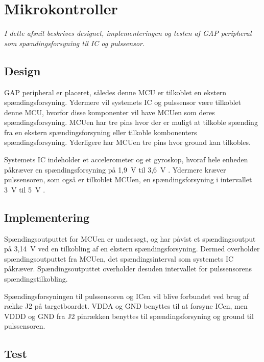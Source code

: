 \section{Mikrokontroller}
\textit{I dette afsnit beskrives designet, implementeringen og testen af GAP peripheral som spændingsforsyning til IC og pulssensor.}

\subsection{Design}
GAP peripheral er placeret, således denne MCU er tilkoblet en ekstern spændingsforsyning. Ydermere vil systemets IC og pulssensor være tilkoblet denne MCU, hvorfor disse komponenter vil have MCUen som deres spændingsforsyning. \newline
MCUen har tre pins hvor der er muligt at tilkoble spænding fra en ekstern spændingsforsyning eller tilkoble kombonenters spændingsforsyning. Yderligere har MCUen tre pins hvor ground kan tilkobles. \citep{Semiconductor2016} \newline

Systemets IC indeholder et accelerometer og et gyroskop, hvoraf hele enheden påkræver en spændingsforsyning på 1,9~V til 3,6~V \citep{Jimb02016}.
Ydermere kræver pulssensoren, som også er tilkoblet MCUen, en spændingsforsyning i intervallet 3~V til 5~V \citep{Murphy2016}.

\subsection{Implementering}
Spændingsoutputtet for MCUen er undersøgt, og har påvist et spændingsoutput på 3,14~V ved en tilkobling af en ekstern spændingsforsyning. Dermed overholder spændingsoutputtet fra MCUen, det spændingsinterval som systemets IC påkræver. Spændingsoutputtet overholder desuden intervallet for pulssensorens spændingstilkobling. \newline

Spændingsforsyningen til pulssensoren og ICen vil blive forbundet ved brug af række J2 på targetboardet. VDDA og GND benyttes til at forsyne ICen, men VDDD og GND fra J2 pinrækken benyttes til spændingsforsyning og ground til pulssensoren. \newline


\subsection{Test}

